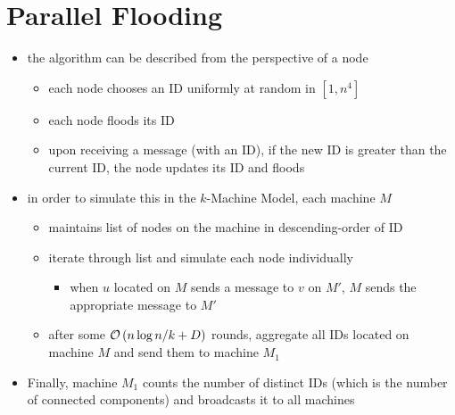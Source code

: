 \section{Parallel Flooding}
\begin{frame}
    \begin{itemize}
        \item the algorithm can be described from the perspective of a node
              \begin{itemize}
                  \item each node chooses an ID uniformly at random in $[1, n^4]$
                  \item each node floods its ID
                  \item upon receiving a message (with an ID), if the new ID is
                        greater than the current ID, the node updates its ID and
                        floods
              \end{itemize}
        \item in order to simulate this in the $k$-Machine Model, each machine $M$
              \begin{itemize}
                  \item maintains list of nodes on the machine in descending-order of ID
                  \item iterate through list and simulate each node individually
                        \begin{itemize}
                            \item when $u$ located on $M$ sends a message to $v$ on $M'$, $M$ sends the appropriate message to $M'$
                        \end{itemize}
                  \item after some $\mathcal{O}\left(n\log{n} / k + D\right)$ rounds,
                        aggregate all IDs located on machine $M$ and send them to
                        machine $M_1$
              \end{itemize}
        \item Finally, machine $M_1$ counts the number of distinct IDs (which is the number of connected components) and broadcasts it to all machines
    \end{itemize}
\end{frame}

